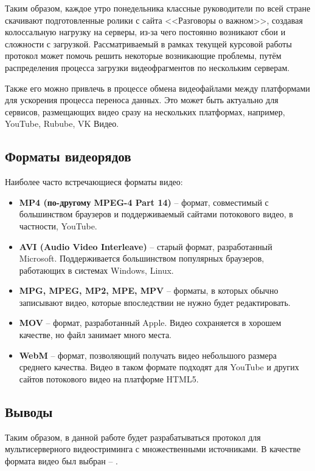 Таким образом, каждое утро понедельника классные руководители по всей стране скачивают подготовленные ролики с сайта <<Разговоры о важном>>, создавая колоссальную нагрузку на серверы, из-за чего постоянно возникают сбои и сложности с загрузкой. Рассматриваемый в рамках текущей курсовой работы протокол может помочь решить некоторые возникающие проблемы, путём распределения процесса загрузки видеофрагментов по нескольким серверам.

Также его можно привлечь в процессе обмена видеофайлами между платформами для ускорения процесса переноса данных. Это может быть актуально для сервисов, размещающих видео сразу на нескольких платформах, например, YouTube, Rubube, VK Видео. \\

\subsection{Форматы видеорядов}
Наиболее часто встречающиеся форматы видео:
\begin{itemize}
	\item \textbf{MP4 (по-другому MPEG-4 Part 14)} – формат, совместимый с большинством браузеров и поддерживаемый сайтами потокового видео, в частности, YouTube.
	
	\item \textbf{AVI (Audio Video Interleave)} – старый формат, разработанный Microsoft. Поддерживается большинством популярных браузеров, работающих в системах Windows, Linux. 
	
	\item \textbf{MPG, MPEG, MP2, MPE, MPV} – форматы, в которых обычно записывают видео, которые впоследствии не нужно будет редактировать.
	
	\item \textbf{MOV} – формат, разработанный Apple. Видео сохраняется в хорошем качестве, но файл занимает много места.
	
	\item \textbf{WebM} – формат, позволяющий получать видео небольшого размера среднего качества. Видео в таком формате подходят для YouTube и других сайтов потокового видео на платформе HTML5.
\end{itemize}


\subsection*{Выводы}
Таким образом, в данной работе будет разрабатываться протокол для мультисерверного видеостриминга с множественными источниками. В качестве формата видео был выбран -- .

















